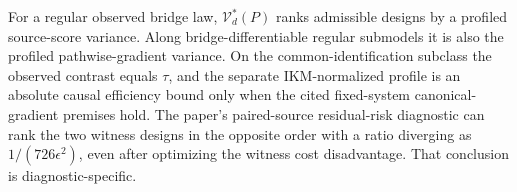 For a regular observed bridge law, \(\mathcal V_d^*(P)\) ranks admissible designs by a profiled source-score variance.  Along bridge-differentiable regular submodels it is also the profiled pathwise-gradient variance.  On the common-identification subclass the observed contrast equals \(\tau\), and the separate IKM-normalized profile is an absolute causal efficiency bound only when the cited fixed-system canonical-gradient premises hold.  The paper's paired-source residual-risk diagnostic can rank the two witness designs in the opposite order with a ratio diverging as \(1/(726\epsilon^2)\), even after optimizing the witness cost disadvantage.  That conclusion is diagnostic-specific.
